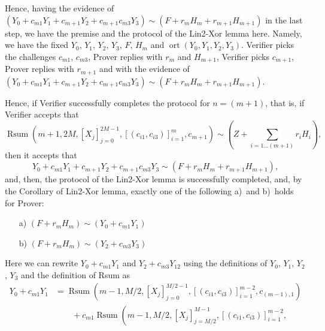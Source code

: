 \documentclass{mathcryptology} %
\DeclareMathOperator{\ort}{ort}
\DeclareMathOperator{\Rsum}{Rsum}
\theoremstyle{title}
\theoremstyle{titleof}
\renewenvironment{proof}{\noindent{\bfseries Proof:} }{}
\begin{document}
\begin{proof}
        Hence, having the evidence of $\left(Y_{0}+c_{m1} Y_{1}+c_{m+1} Y_{2}+c_{m+1}c_{m3} Y_{3}\right) \sim \left(F+r_{m}H_{m}+r_{m+1}H_{m+1}\right)$ in the last step, we have the premise and the protocol of the Lin2-Xor lemma here.
        Namely, we have the fixed $Y_{0}$, $Y_{1}$, $Y_{2}$, $Y_{3}$, $F$, $H_{m}$ and $\ort\left(Y_{0}, Y_{1},
        Y_{2}, Y_{3}\right)$. Verifier picks the challenges $c_{m1}$,  $c_{m3}$, Prover replies with $r_{m}$ and $H_{m+1}$, Verifier picks $c_{m+1}$, Prover replies with $r_{m+1}$ and with the evidence of
        $\left(Y_{0}+c_{m1} Y_{1}+c_{m+1} Y_{2}+c_{m+1}c_{m3} Y_{3}\right)\sim \left(F+r_{m}H_{m}+r_{m+1}H_{m+1}\right)$.

        Hence, if Verifier successfully completes the protocol for $n=\left(m+1\right)$, that is, if Verifier accepts that
        \begin{equation*}
            \Rsum\left(m+1, 2M, {\left[X_{j}\right]}_{j=0}^{2M-1}, {\left[\left(c_{i1}, c_{i3}\right)\right]}_{i=1}^{m}, c_{m+1}\right) \sim  \left(Z+\sum_{i=1\dots\left(m+1\right)} r_iH_i\right),
        \end{equation*}
        then it accepts that
        \begin{equation*}
            Y_{0}+c_{m1} Y_{1}+c_{m+1} Y_{2}+c_{m+1}c_{m3} Y_{3} \sim \left(F+r_{m}H_{m}+r_{m+1}H_{m+1}\right),
        \end{equation*}
        and, then, the protocol of the Lin2-Xor lemma is successfully completed, and, by the Corollary of Lin2-Xor lemma, exactly one of the following a)~and b)~holds for Prover:
        \begin{itemize}
            \item[a)] $\left(F+r_{m}H_{m}\right) \sim \left(Y_{0}+c_{m1} Y_{1}\right)$
            \item[b)] $\left(F+r_{m}H_{m}\right) \sim \left( Y_{2}+c_{m3} Y_{3}\right)$
        \end{itemize}  
        Here we can rewrite $Y_{0}+c_{m1}Y_{1}$ and $Y_{2}+c_{m3}Y_{12}$ using the definitions of $Y_{0}$, $Y_{1}$, $Y_{2}$, $Y_{3}$ and the definition of Rsum as
        \begin{align*}
            Y_{0}+c_{m1}Y_{1} & =
                \Rsum\left(m-1, M/2, {\left[X_{j}\right]}_{j=0}^{M/2-1},
                {\left[\left(c_{i1},c_{i3}\right)\right]}_{i=1}^{m-2},
                c_{\left(m-1\right),1}\right) \\
                &\qquad+
                c_{m1}\Rsum\left(m-1, M/2, {\left[X_{j}\right]}_{j=M/2}^{M-1},
                {\left[\left(c_{i1}, c_{i3}\right)\right]}_{i=1}^{m-2},

\end{align*}
\end{proof}
\end{document}
